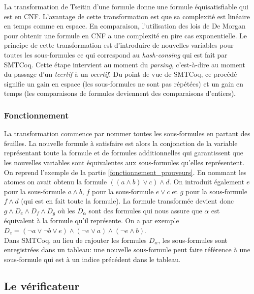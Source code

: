 \documentclass[11pt]{article}
\begin{document}
La transformation de Tseitin d'une formule donne une formule équisatisfiable qui est en CNF. L'avantage de cette transformation est que sa complexité est linéaire en temps comme en espace. En comparaison, l'utilisation des lois de De Morgan pour obtenir une formule en CNF a une complexité en pire cas exponentielle. Le principe de cette transformation est d'introduire de nouvelles variables pour toutes les sous-formules ce qui correspond au \textit{hash-consing} qui est fait par SMTCoq. Cette étape intervient au moment du \textit{parsing}, c'est-à-dire au moment du passage d'un \textit{tcertif} à un \textit{ocertif}. Du point de vue de SMTCoq, ce procédé signifie un gain en espace (les sous-formules ne sont pas répétées) et un gain en temps (les comparaisons de formules deviennent des comparaisons d'entiers).


\subsubsection{Fonctionnement}

La transformation commence par nommer toutes les sous-formules en partant des feuilles. La nouvelle formule à satisfaire est alors la conjonction de la variable représentant toute la formule et de formules additionnelles qui garantissent que les nouvelles variables sont équivalentes aux sous-formules qu'elles représentent. \\

On reprend l'exemple de la partie \ref{fonctionnement_prouveurs}. En nommant les atomes on avait obtenu la formule $((a \wedge b) \vee c) \wedge d$. On introduit également $e$ pour la sous-formule $a \wedge b$, $f$ pour la sous-formule $e \vee c$ et $g$ pour la sous-formule $f \wedge d$ (qui est en fait toute la formule). La formule transformée devient donc $g \wedge D_e \wedge D_f \wedge D_g$ où les $D_\alpha$ sont des formules qui nous assure que $\alpha$ est équivalent à la formule qu'il représente. On a par exemple $D_e = (\neg a \vee \neg b \vee e) \wedge (\neg e \vee a) \wedge (\neg e \wedge b)$. \\

Dans SMTCoq, au lieu de rajouter les formules $D_\alpha$, les sous-formules sont enregistrées dans un tableau: une nouvelle sous-formule peut faire référence à une sous-formule qui est à un indice précédent dans le tableau. 

\subsection{Le vérificateur}
\end{document}
